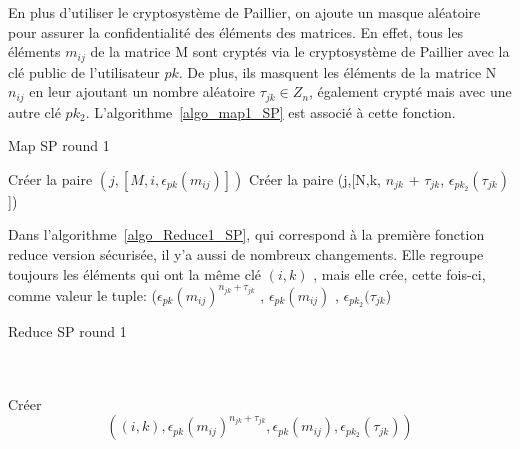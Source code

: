 En plus d'utiliser le cryptosystème de Paillier, on ajoute un masque aléatoire pour assurer la confidentialité des éléments des matrices.
En effet, tous les éléments $m_{ij}$ de la matrice M sont cryptés via le cryptosystème de Paillier avec la clé public de l'utilisateur $pk$. 
De plus, ils masquent les éléments de la matrice N $n_{ij}$  en  leur ajoutant un nombre aléatoire  $\tau_{jk} \in {Z}_{n}$, 
également crypté mais avec une autre clé $pk_{2}$.
L'algorithme~\ref{algo_map1_SP} est associé à cette fonction.
\begin{algorithm}[H]
  \caption{Map SP round 1}
  \label{algo_map1_SP}
  \begin{algorithmic}
    \State Créer la paire $(j,[M,i,\epsilon_{pk}(m_{ij})])$
    \EndFor
    \State Créer la paire (j,[N,k, $n_{jk}$ + $\tau_{jk}$, $\epsilon_{pk_{2}}(\tau _{jk})$])
    \EndFor
  \end{algorithmic}
\end{algorithm}

Dans l'algorithme~\ref{algo_Reduce1_SP}, qui correspond à la première fonction reduce version sécurisée, il y'a aussi de nombreux changements.
Elle regroupe toujours les éléments qui ont la même clé $(i,k)$ , mais elle crée, cette fois-ci, comme valeur le tuple: ($\epsilon_{pk}(m_{ij})^{n_{jk} + \tau_{jk}}$ , $ \epsilon_{pk}(m_{ij})$ , $\epsilon_{pk_{2}}(\tau _{jk}$)
\littlesectionspace
\begin{algorithm}[H]
  \caption{Reduce SP round 1}
  \label{algo_Reduce1_SP}
  \begin{algorithmic}
	\\						  
    \\
    \State Cr\'{e}er  
			\[
				((i,k), \epsilon_{pk}(m_{ij})^{n_{jk} + \tau _{jk}}, \epsilon_{pk}(m_{ij}),\epsilon_{pk_{2}}(\tau _{jk}))
			\]
		
    \EndFor
  \end{algorithmic}
\end{algorithm}

